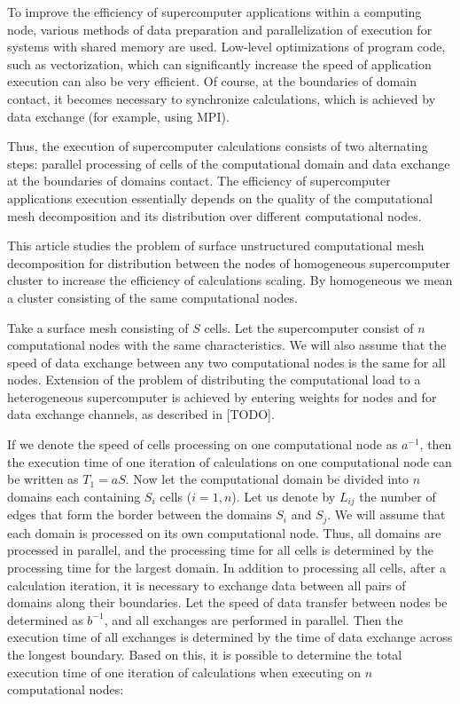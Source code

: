 \documentclass[
11pt,%
tightenlines,%
twoside,%
onecolumn,%
nofloats,%
nobibnotes,%
nofootinbib,%
superscriptaddress,%
noshowpacs,%
centertags]%
{revtex4}
\begin{document}
To improve the efficiency of supercomputer applications within a computing node, various methods of data preparation and parallelization of execution for systems with shared memory are used.
Low-level optimizations of program code, such as vectorization, which can significantly increase the speed of application execution can also be very efficient.
Of course, at the boundaries of domain contact, it becomes necessary to synchronize calculations, which is achieved by data exchange (for example, using MPI).

Thus, the execution of supercomputer calculations consists of two alternating steps: parallel processing of cells of the computational domain and data exchange at the boundaries of domains contact.
The efficiency of supercomputer applications execution essentially depends on the quality of the computational mesh decomposition and its distribution over different computational nodes.

This article studies the problem of surface unstructured computational mesh decomposition for distribution between the nodes of homogeneous supercomputer cluster to increase the efficiency of calculations scaling.
By homogeneous we mean a cluster consisting of the same computational nodes.

Take a surface mesh consisting of $ S $ cells.
Let the supercomputer consist of $ n $ computational nodes with the same characteristics.
We will also assume that the speed of data exchange between any two computational nodes is the same for all nodes.
Extension of the problem of distributing the computational load to a heterogeneous supercomputer is achieved by entering weights for nodes and for data exchange channels, as described in [TODO].

If we denote the speed of cells processing on one computational node as $ a^{-1} $, then the execution time of one iteration of calculations on one computational node can be written as $ T_1 = aS $.
Now let the computational domain be divided into $ n $ domains each containing $ S_i $ cells ($ i = 1, n $).
Let us denote by $ L_{ij} $ the number of edges that form the border between the domains $ S_i $ and $ S_j $.
We will assume that each domain is processed on its own computational node.
Thus, all domains are processed in parallel, and the processing time for all cells is determined by the processing time for the largest domain.
In addition to processing all cells, after a calculation iteration, it is necessary to exchange data between all pairs of domains along their boundaries.
Let the speed of data transfer between nodes be determined as $ b^{-1} $, and all exchanges are performed in parallel.
Then the execution time of all exchanges is determined by the time of data exchange across the longest boundary.
Based on this, it is possible to determine the total execution time of one iteration of calculations when executing on $ n $ computational nodes:
\end{document}
